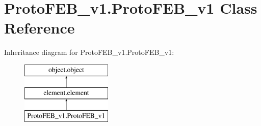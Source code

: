 \hypertarget{classProtoFEB__v1_1_1ProtoFEB__v1}{}\section{Proto\+F\+E\+B\+\_\+v1.\+Proto\+F\+E\+B\+\_\+v1 Class Reference}
\label{classProtoFEB__v1_1_1ProtoFEB__v1}
Inheritance diagram for Proto\+F\+E\+B\+\_\+v1.\+Proto\+F\+E\+B\+\_\+v1\+:\begin{figure}[H]
\begin{center}
\leavevmode
\includegraphics[height=3.000000cm]{classProtoFEB__v1_1_1ProtoFEB__v1}
\end{center}
\end{figure}
